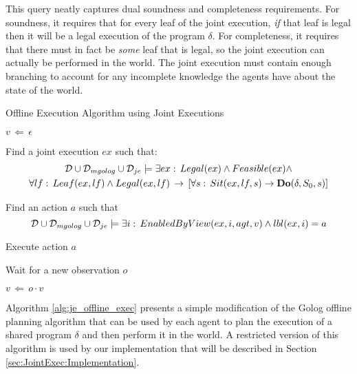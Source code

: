 This query neatly captures dual soundness and completeness requirements.
For soundness, it requires that for every leaf of the joint execution,
\emph{if} that leaf is legal then it will be a legal execution of
the program $\delta$. For completeness, it requires that there must
in fact be \emph{some} leaf that is legal, so the joint execution
can actually be performed in the world. The joint execution must contain
enough branching to account for any incomplete knowledge the agents
have about the state of the world.

%
\begin{algorithm}[t]
 

\caption{Offline Execution Algorithm using Joint Executions}


\label{alg:je_offline_exec} \begin{algorithmic}

\STATE

\STATE $v\,\Leftarrow\,\epsilon$

\STATE Find a joint execution $ex$ such that:\begin{multline*}
\mathcal{D}\cup\mathcal{D}_{mgolog}\cup\mathcal{D}_{je}\models\exists ex:\, Legal(ex)\wedge Feasible(ex)\wedge\\
\forall lf:\, Leaf(ex,lf)\wedge Legal(ex,lf)\,\rightarrow\,\left[\forall s:\, Sit(ex,lf,s)\rightarrow\mathbf{Do}(\delta,S_{0},s)\right]\end{multline*}



\STATE Find an action $a$ such that\[
\mathcal{D}\cup\mathcal{D}_{mgolog}\cup\mathcal{D}_{je}\models\exists i:\, EnabledByView(ex,i,agt,v)\wedge lbl(ex,i)=a\]



\STATE Execute action $a$

\ENDIF

\STATE Wait for a new observation $o$

\STATE $v\,\Leftarrow\, o\cdot v$

\ENDWHILE

\end{algorithmic} 
\end{algorithm}


Algorithm \ref{alg:je_offline_exec} presents a simple modification
of the Golog offline planning algorithm that can be used by each agent
to plan the execution of a shared program $\delta$ and then perform
it in the world. A restricted version of this algorithm is used by
our implementation that will be described in Section \ref{sec:JointExec:Implementation}.

